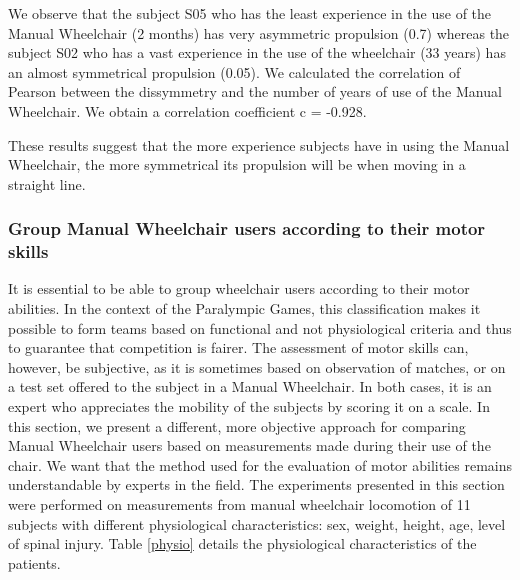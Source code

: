 We observe that the subject S05 who has the least experience in the use of the Manual Wheelchair (2 months) has very asymmetric propulsion (0.7) whereas the subject S02 who has a vast experience in the use of the wheelchair (33 years) has an almost symmetrical propulsion (0.05). We calculated the correlation of Pearson between the dissymmetry and the number of years of use of the Manual Wheelchair. We obtain a correlation coefficient c = -0.928. 



These results suggest that the more experience subjects have in using the Manual Wheelchair, the more symmetrical its propulsion will be when moving in a straight line. 


\subsubsection{Group Manual Wheelchair users according to their motor skills}

It is essential to be able to group wheelchair users according to their motor abilities. In the context of the Paralympic Games, this classification makes it possible to form teams based on functional and not physiological criteria and thus to guarantee that competition is fairer. The assessment of motor skills can, however, be subjective, as it is sometimes based on observation of matches, or on a test set offered to the subject in a Manual Wheelchair. In both cases, it is an expert who appreciates the mobility of the subjects by scoring it on a scale. In this section, we present a different, more objective approach for comparing Manual Wheelchair users based on measurements made during their use of the chair. We want that the method used for the evaluation of motor abilities remains understandable by experts in the field. The experiments presented in this section were performed on measurements from manual wheelchair locomotion of 11 subjects with different physiological characteristics: sex, weight, height, age, level of spinal injury. Table \ref{physio} details the physiological characteristics of the patients. 

